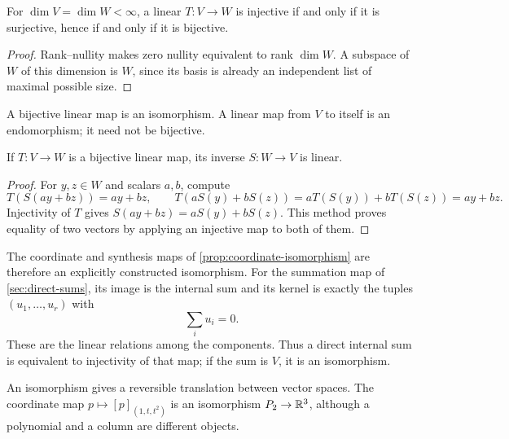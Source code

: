 \begin{corollary}
\label{cor:linear-bijectivity}
For $\dim V=\dim W<\infty$, a linear $T:V\to W$ is injective if and
only if it is surjective, hence if and only if it is bijective.
\end{corollary}
\begin{proof}
Rank--nullity makes zero nullity equivalent to rank $\dim W$.
A subspace of $W$ of this dimension is $W$, since its basis is already
an independent list of maximal possible size.
\end{proof}

\begin{definition}
A bijective linear map is an isomorphism. A linear map from $V$ to itself
is an endomorphism; it need not be bijective.
\end{definition}
\begin{proposition}
If $T:V\to W$ is a bijective linear map, its inverse $S:W\to V$ is linear.
\end{proposition}
\begin{proof}
For $y,z\in W$ and scalars $a,b$, compute
\[
T(S(ay+bz))=ay+bz,
\qquad T(aS(y)+bS(z))=aT(S(y))+bT(S(z))=ay+bz.
\]
Injectivity of $T$ gives $S(ay+bz)=aS(y)+bS(z)$. This method proves equality
of two vectors by applying an injective map to both of them.
\end{proof}
The coordinate and synthesis maps of \cref{prop:coordinate-isomorphism}
are therefore an explicitly constructed isomorphism. For the summation map
of \cref{sec:direct-sums}, its image is the internal sum and its kernel is
exactly the tuples $(u_1,\ldots,u_r)$ with
\[
\sum_i u_i=0.
\]
 These are the
linear relations among the components. Thus a direct internal sum is
equivalent to injectivity of that map; if the sum is $V$, it is an isomorphism.

An isomorphism gives a reversible translation between vector spaces.
The coordinate map $p\mapsto[p]_{(1,t,t^2)}$ is an isomorphism
$P_2\to\mathbb{R}^3$, although a polynomial and a column are different objects.

